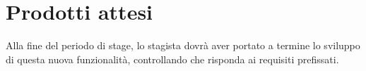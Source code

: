 \section*{Prodotti attesi}
Alla fine del periodo di stage, lo stagista dovrà aver portato a termine lo sviluppo di questa nuova funzionalità, controllando
che risponda ai requisiti prefissati.
